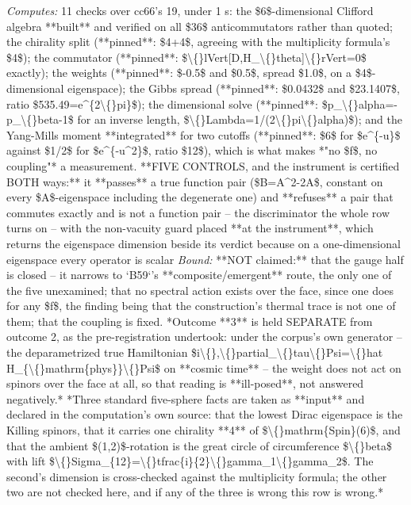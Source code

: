 \begin{description}
\emph{Computes:} 11 checks over cc66's 19, under 1 s: the \$6\$-dimensional Clifford algebra **built** and verified on all \$36\$ anticommutators rather than quoted; the chirality split (**pinned**: \$4+4\$, agreeing with the multiplicity formula's \$4\$); the commutator (**pinned**: \$\textbackslash\{\}lVert[D,H\_\textbackslash\{\}theta]\textbackslash\{\}rVert=0\$ exactly); the weights (**pinned**: \$-0.5\$ and \$0.5\$, spread \$1.0\$, on a \$4\$-dimensional eigenspace); the Gibbs spread (**pinned**: \$0.0432\$ and \$23.1407\$, ratio \$535.49=e\textasciicircum{}\{2\textbackslash\{\}pi\}\$); the dimensional solve (**pinned**: \$p\_\textbackslash\{\}alpha=-p\_\textbackslash\{\}beta-1\$ for an inverse length, \$\textbackslash\{\}Lambda=1/(2\textbackslash\{\}pi\textbackslash\{\}alpha)\$); and the Yang-Mills moment **integrated** for two cutoffs (**pinned**: \$6\$ for \$e\textasciicircum{}\{-u\}\$ against \$1/2\$ for \$e\textasciicircum{}\{-u\textasciicircum{}2\}\$, ratio \$12\$), which is what makes *"no \$f\$, no coupling"* a measurement. **FIVE CONTROLS, and the instrument is certified BOTH ways:** it **passes** a true function pair (\$B=A\textasciicircum{}2-2A\$, constant on every \$A\$-eigenspace including the degenerate one) and **refuses** a pair that commutes exactly and is not a function pair -- the discriminator the whole row turns on -- with the non-vacuity guard placed **at the instrument**, which returns the eigenspace dimension beside its verdict because on a one-dimensional eigenspace every operator is scalar
 \emph{Bound:} **NOT claimed:** that the gauge half is closed -- it narrows to `B59`'s **composite/emergent** route, the only one of the five unexamined; that no spectral action exists over the face, since one does for any \$f\$, the finding being that the construction's thermal trace is not one of them; that the coupling is fixed.  *Outcome **3** is held SEPARATE from outcome 2, as the pre-registration undertook: under the corpus's own generator -- the deparametrized true Hamiltonian \$i\textbackslash\{\},\textbackslash\{\}partial\_\textbackslash\{\}tau\textbackslash\{\}Psi=\textbackslash\{\}hat H\_\{\textbackslash\{\}mathrm\{phys\}\}\textbackslash\{\}Psi\$ on **cosmic time** -- the weight does not act on spinors over the face at all, so that reading is **ill-posed**, not answered negatively.*  *Three standard five-sphere facts are taken as **input** and declared in the computation's own source: that the lowest Dirac eigenspace is the Killing spinors, that it carries one chirality **4** of \$\textbackslash\{\}mathrm\{Spin\}(6)\$, and that the ambient \$(1,2)\$-rotation is the great circle of circumference \$\textbackslash\{\}beta\$ with lift \$\textbackslash\{\}Sigma\_\{12\}=\textbackslash\{\}tfrac\{i\}\{2\}\textbackslash\{\}gamma\_1\textbackslash\{\}gamma\_2\$. The second's dimension is cross-checked against the multiplicity formula; the other two are not checked here, and if any of the three is wrong this row is wrong.*

\end{description}
